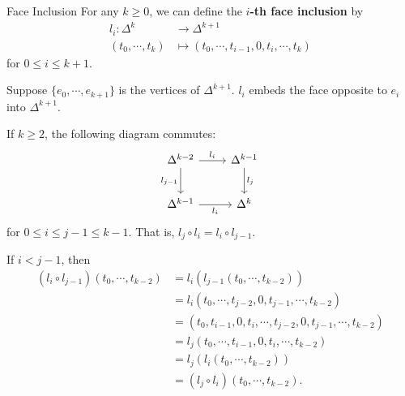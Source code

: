 \documentclass{report}
\begin{document}
\begin{definition}{Face Inclusion}{}
	For any $k\ge 0$, we can define the \textbf{$i$-th face inclusion} by
	\begin{align*}
		l_i: \Delta^{k}    & \longrightarrow  \Delta^{k+1}                               \\
		(t_0, \cdots, t_k) & \longmapsto (t_0, \cdots, t_{i-1}, 0, t_{i}, \cdots, t_{k})
	\end{align*}
	for $0\leq i\leq k+1$.
\end{definition}

Suppose $\{e_0,\cdots,e_{k+1}\}$ is the vertices of $\Delta^{k+1}$. $l_i$ embeds the face opposite to $e_i$ into $\Delta^{k+1}$.

\begin{proposition}{}{}
	If $k\ge 2$, the following diagram commutes:
	\begin{equation*}
		\begin{tikzcd}[ampersand replacement=\&]
			\Delta^{k-2} \arrow[r, "l_i"] \arrow[d, "l_{j-1}"']
			\& \Delta^{k-1}  \arrow[d, "l_{j}"] \\ [5pt]
			\Delta^{k-1}  \arrow[r, "l_i"']
			\&  \Delta^{k}
		\end{tikzcd}
	\end{equation*}
	for $0\le i\le j-1\le k-1$. That is, $l_j\circ l_i=l_i\circ l_{j-1}$.
\end{proposition}

\begin{prf}
	If $i<j-1$, then
	\[
		\begin{aligned}
			\left(l_i\circ l_{j-1}\right)(t_0, \cdots, t_{k-2}) & =l_i\left(l_{j-1}(t_0, \cdots, t_{k-2})\right)                                  \\
			                                                    & =l_i\left(t_0, \cdots, t_{j-2}, 0, t_{j-1}, \cdots, t_{k-2}\right)              \\
			                                                    & =\left(t_0, t_{i-1},0,t_{i},\cdots, t_{j-2}, 0, t_{j-1}, \cdots, t_{k-2}\right) \\
			                                                    & =l_j\left(t_0, \cdots, t_{i-1}, 0, t_{i}, \cdots, t_{k-2}\right)                \\
			                                                    & =l_j\left(l_i(t_0, \cdots, t_{k-2})\right)                                      \\
			                                                    & =(l_j \circ l_i)(t_0, \cdots, t_{k-2}).
		\end{aligned}
	\]
\end{prf}
\end{document}
